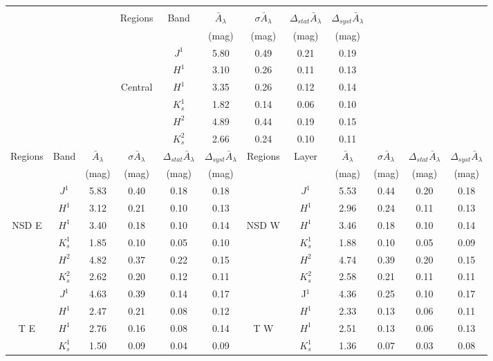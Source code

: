 \documentclass{aa}
\begin{document}
\begin{table*}[t!]
\begin{center}
\begin{tabular}{cccccc|cccccc}
 &  &  &  &  & \multicolumn{1}{c}{} &  &  &  &  &  & \tabularnewline
\cline{4-9} \cline{5-9} \cline{6-9} \cline{7-9} \cline{8-9} \cline{9-9} 
 &  &  & Regions  & Band  & \multicolumn{1}{c}{$\bar{A}_{\lambda}$ } & $\sigma\bar{A}_{\lambda}$  & $\Delta_{stat}\bar{A}_{\lambda}$  & $\Delta_{syst}\bar{A}_{\lambda}$ &  &  & \tabularnewline
 &  &  &  &  & \multicolumn{1}{c}{(mag) } & (mag)  & (mag)  & (mag)  &  &  & \tabularnewline
\cline{4-9} \cline{5-9} \cline{6-9} \cline{7-9} \cline{8-9} \cline{9-9} 
 &  &  &  & $J^{1}$  & \multicolumn{1}{c}{5.80 } & 0.49  & 0.21  & 0.19  &  &  & \tabularnewline
 &  &  &  & $H^{1}$  & \multicolumn{1}{c}{3.10 } & 0.26  & 0.11  & 0.13  &  &  & \tabularnewline
 &  &  & Central & $H^{1}$  & \multicolumn{1}{c}{3.35} & 0.26  & 0.12  & 0.14  &  &  & \tabularnewline
 &  &  &  & $K_{s}^{1}$  & \multicolumn{1}{c}{1.82 } & 0.14  & 0.06  & 0.10  &  &  & \tabularnewline
 &  &  &  & $H^{2}$  & \multicolumn{1}{c}{4.89 } & 0.44  & 0.19  & 0.15  &  &  & \tabularnewline
 &  &  &  & $K_{s}^{2}$  & \multicolumn{1}{c}{2.66 } & 0.24  & 0.10 & 0.11  &  &  & \tabularnewline
\hline 
\hline 
Regions  & Band  & $\bar{A}_{\lambda}$  & $\sigma\bar{A}_{\lambda}$  & $\Delta_{stat}\bar{A}_{\lambda}$  & $\Delta_{syst}\bar{A}_{\lambda}$ & Regions  & Layer  & $\bar{A}_{\lambda}$  & $\sigma\bar{A}_{\lambda}$  & $\Delta_{stat}\bar{A}_{\lambda}$  & $\Delta_{syst}\bar{A}_{\lambda}$ \tabularnewline
 &  & (mag)  & (mag)  & (mag)  & (mag)  &  &  & (mag)  & (mag)  & (mag)  & (mag) \tabularnewline
\hline 
 & $J^{1}$  & 5.83  & 0.40  & 0.18  & 0.18  &  & $J^{1}$  & 5.53  & 0.44  & 0.20  & 0.18\tabularnewline
 & $H^{1}$  & 3.12  & 0.21  & 0.10  & 0.13  &  & $H^{1}$  & 2.96  & 0.24  & 0.11  & 0.13\tabularnewline
NSD E  & $H^{1}$  & 3.40  & 0.18  & 0.10  & 0.14  & NSD W  & $H^{1}$  & 3.46  & 0.18  & 0.10  & 0.14\tabularnewline
 & $K_{s}^{1}$  & 1.85  & 0.10  & 0.05  & 0.10  &  & $K_{s}^{1}$  & 1.88  & 0.10  & 0.05  & 0.09\tabularnewline
 & $H^{2}$  & 4.82  & 0.37  & 0.22  & 0.15  &  & $H^{2}$  & 4.74  & 0.39 & 0.20  & 0.15\tabularnewline
 & $K_{s}^{2}$  & 2.62  & 0.20  & 0.12  & 0.11  &  & $K_{s}^{2}$  & 2.58  & 0.21  & 0.11  & 0.11\tabularnewline
\hline 
 & $J^{1}$  & 4.63  & 0.39  & 0.14  & 0.17  &  & J$^{1}$  & 4.36  & 0.25  & 0.10  & 0.17\tabularnewline
 & $H^{1}$  & 2.47  & 0.21  & 0.08  & 0.12  &  & $H^{1}$  & 2.33  & 0.13  & 0.06  & 0.11\tabularnewline
T E  & $H^{1}$  & 2.76  & 0.16  & 0.08  & 0.14  & T W  & $H^{1}$  & 2.51  & 0.13  & 0.06  & 0.13\tabularnewline
 & $K_{s}^{1}$  & 1.50  & 0.09  & 0.04  & 0.09  &  & $K_{s}^{1}$  & 1.36  & 0.07  & 0.03  & 0.08\tabularnewline

\end{tabular}
\end{center}
\end{table*}
\end{document}
